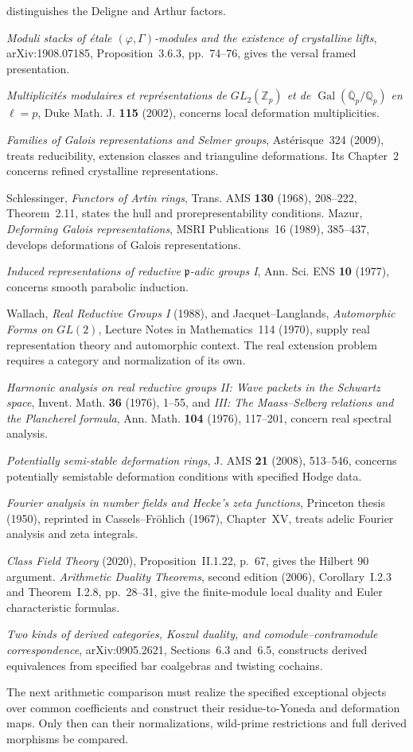 \begin{description}[style=nextline,leftmargin=0pt,labelwidth=0pt]
distinguishes the Deligne and Arthur factors.
\item[Emerton--Gee.]
\emph{Moduli stacks of \textup{\'{e}}tale $(\varphi,\Gamma)$-modules
and the existence of crystalline lifts}, arXiv:1908.07185,
Proposition~3.6.3, pp.~74--76, gives the versal framed presentation.
\item[Breuil--M\'ezard.]
\emph{Multiplicit\'es modulaires et repr\'esentations de
$GL_2(\mathbb Z_p)$ et de $\operatorname{Gal}(\overline{\mathbb Q}_p/\mathbb Q_p)$
en $\ell=p$}, Duke Math. J. \textbf{115} (2002), concerns local
deformation multiplicities.
\item[Bella\"iche--Chenevier.]
\emph{Families of Galois representations and Selmer groups},
Ast\'erisque~324 (2009), treats reducibility, extension classes and
trianguline deformations. Its Chapter~2 concerns refined crystalline
representations.
\item[Schlessinger and Mazur.]
Schlessinger, \emph{Functors of Artin rings}, Trans. AMS
\textbf{130} (1968), 208--222, Theorem~2.11, states the hull and
prorepresentability conditions. Mazur, \emph{Deforming Galois
representations}, MSRI Publications~16 (1989), 385--437, develops
deformations of Galois representations.
\item[Bernstein--Zelevinsky.]
\emph{Induced representations of reductive $\mathfrak p$-adic groups I},
Ann. Sci. ENS \textbf{10} (1977), concerns smooth parabolic induction.
\item[Wallach and Jacquet--Langlands.]
Wallach, \emph{Real Reductive Groups I} (1988), and Jacquet--Langlands,
\emph{Automorphic Forms on $GL(2)$}, Lecture Notes in Mathematics~114
(1970), supply real representation theory and automorphic context.
The real extension problem requires a category and normalization of its own.
\item[Harish-Chandra.]
\emph{Harmonic analysis on real reductive groups II: Wave packets in
the Schwartz space}, Invent. Math. \textbf{36} (1976), 1--55, and
\emph{III: The Maass--Selberg relations and the Plancherel formula},
Ann. Math. \textbf{104} (1976), 117--201, concern real spectral analysis.
\item[Kisin.]
\emph{Potentially semi-stable deformation rings}, J. AMS
\textbf{21} (2008), 513--546, concerns potentially semistable deformation
conditions with specified Hodge data.
\item[Tate.]
\emph{Fourier analysis in number fields and Hecke's zeta functions},
Princeton thesis (1950), reprinted in Cassels--Fr\"ohlich (1967),
Chapter~XV, treats adelic Fourier analysis and zeta integrals.
\item[Milne.]
\emph{Class Field Theory} (2020), Proposition~II.1.22, p.~67,
gives the Hilbert 90 argument. \emph{Arithmetic Duality Theorems},
second edition (2006), Corollary~I.2.3 and Theorem~I.2.8, pp.~28--31,
give the finite-module local duality and Euler characteristic formulas.
\item[Positselski.]
\emph{Two kinds of derived categories, Koszul duality, and
comodule--contramodule correspondence}, arXiv:0905.2621,
Sections~6.3 and~6.5, constructs derived equivalences from specified
bar coalgebras and twisting cochains.
\end{description}
The next arithmetic comparison must realize the specified exceptional
objects over common coefficients and construct their residue-to-Yoneda
and deformation maps. Only then can their normalizations, wild-prime
restrictions and full derived morphisms be compared.
